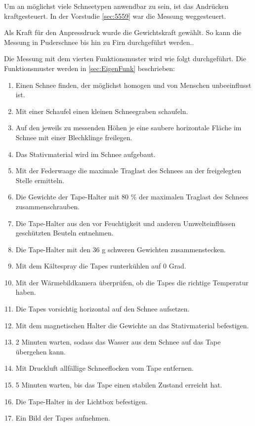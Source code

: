 

Um an möglichst viele Schneetypen anwendbar zu sein, ist das Andrücken kraftgesteuert. In der Vorstudie \ref{sec:5559} war die Messung weggesteuert.

Als Kraft für den Anpressdruck wurde die Gewichtskraft gewählt. So kann die Messung in Puderschnee bis hin zu Firn durchgeführt werden..

Die Messung mit dem vierten Funktionsmuster wird wie folgt durchgeführt. Die Funktionsmuster werden in \ref{sec:EigenFunk} beschrieben:

\begin{enumerate}
\item Einen Schnee finden, der möglichst homogen und von Menschen unbeeinflusst ist.
\item Mit einer Schaufel einen kleinen Schneegraben schaufeln.
\item Auf den jeweils zu messenden Höhen je eine saubere horizontale Fläche im Schnee mit einer Blechklinge freilegen.
\item Das Stativmaterial wird im Schnee aufgebaut.
\item Mit der Federwaage die maximale Traglast des Schnees an der freigelegten Stelle ermitteln.
\item Die Gewichte der Tape-Halter mit 80 \% der maximalen Traglast des Schnees zusammenschrauben.
\item Die Tape-Halter aus den vor Feuchtigkeit und anderen Umwelteinflüssen geschützten Beuteln entnehmen.
\item Die Tape-Halter mit den 36 g schweren Gewichten zusammenstecken.
\item Mit dem Kältespray die Tapes runterkühlen auf 0 Grad.
\item Mit der Wärmebildkamera überprüfen, ob die Tapes die richtige Temperatur haben.
\item Die Tapes vorsichtig horizontal auf den Schnee aufsetzen.
\item Mit dem magnetischen Halter die Gewichte an das Stativmaterial befestigen.
\item 2 Minuten warten, sodass das Wasser aus dem Schnee auf das Tape übergehen kann.
\item Mit Druckluft allfällige Schneeflocken vom Tape entfernen.
\item 5 Minuten warten, bis das Tape einen stabilen Zustand erreicht hat.
\item Die Tape-Halter in der Lichtbox befestigen.
\item Ein Bild der Tapes aufnehmen.
\end{enumerate}
